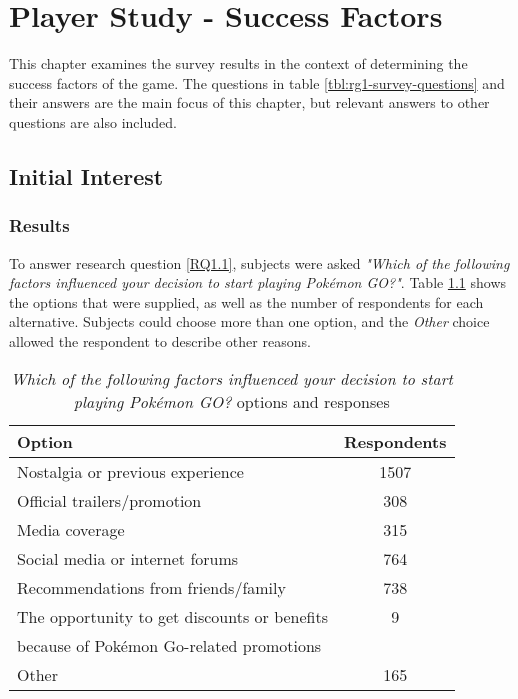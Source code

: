 
\chapter{Player Study - Success Factors}

This chapter examines the survey results in the context of determining the success factors of the game. The questions in table \ref{tbl:rg1-survey-questions} and their answers are the main focus of this chapter, but relevant answers to other questions are also included.

\section{Initial Interest}


\subsection{Results}

To answer research question \ref{RQ1.1}, subjects were asked \emph{"Which of the following factors influenced your decision to start playing Pokémon GO?"}. Table \ref{tbl:initial-interest-options} shows the options that were supplied, as well as the number of respondents for each alternative. Subjects could choose more than one option, and the \emph{Other} choice allowed the respondent to describe other reasons.

\begin{table}[h]
	\caption{\emph{Which of the following factors influenced your decision to start playing Pokémon GO?} options and responses}
	\centering
	\label{tbl:initial-interest-options}
	\begin{tabular}{|l|c|}
		\hline
		\textbf{Option} & \textbf{Respondents}\\
		\hline\hline
		Nostalgia or previous experience & 1507\\\hline
		Official trailers/promotion & 308\\\hline
		Media coverage & 315\\\hline
		Social media or internet forums & 764\\\hline
		Recommendations from friends/family & 738\\\hline
		The opportunity to get discounts or benefits & 9 \\ because of Pokémon Go-related promotions & \\\hline
		Other & 165\\\hline
	\end{tabular}
\end{table}

